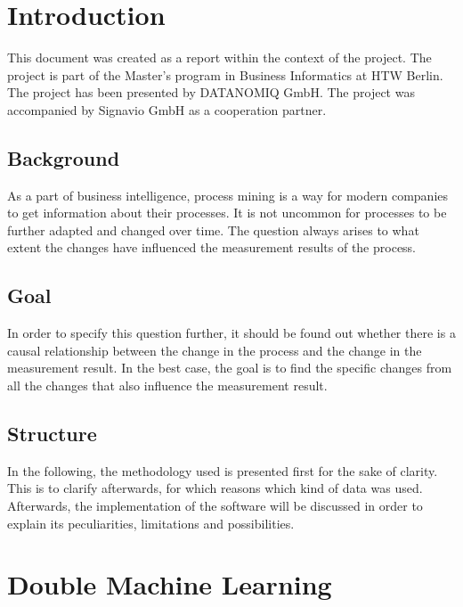 \chapter{Introduction}
    This document was created as a report within the context of the project. The project is part of the Master's program in Business Informatics at HTW Berlin. The project has been presented by DATANOMIQ GmbH. The project was accompanied by Signavio GmbH as a cooperation partner.

    \section{Background}
    As a part of business intelligence, process mining is a way for modern companies to get information about their processes. It is not uncommon for processes to be further adapted and changed over time. The question always arises to what extent the changes have influenced the measurement results of the process.

    \section{Goal}
    In order to specify this question further, it should be found out whether there is a causal relationship between the change in the process and the change in the measurement result. In the best case, the goal is to find the specific changes from all the changes that also influence the measurement result.

    \section{Structure}
    In the following, the methodology used is presented first for the sake of clarity. This is to clarify afterwards, for which reasons which kind of data was used. Afterwards, the implementation of the software will be discussed in order to explain its peculiarities, limitations and possibilities.

\clearpage
\chapter{Double Machine Learning}

